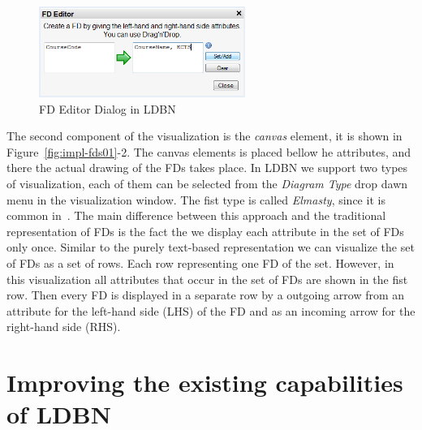 \begin{figure}[h]
	\begin{center}
		\includegraphics[width=0.6\textwidth]{./img/fdeditor.png}
		\caption{FD Editor Dialog in LDBN}
		\label{fig:fdeditor}
	\end{center}
\end{figure}

The second component of the visualization is the \emph{canvas} element, it is shown in Figure~\ref{fig:impl-fds01}-2.
The canvas elements is placed bellow he attributes, and there the actual drawing 
of the FDs takes place. In LDBN we support two types of visualization, each of them can be selected
from the \emph{Diagram Type} drop dawn menu in the visualization window. The fist type is called 
\emph{Elmasty}, since it is common in~\cite{bdb1}. The main difference between this approach and
the traditional representation of FDs is the fact the we display each attribute in the set of 
FDs only once. 
Similar to the purely text-based representation we can visualize the set
of FDs as a set of rows. Each row representing one FD of the set. 
However, in this visualization all attributes that occur in the set of FDs
are shown in the fist row. Then every FD is displayed in a separate row by a outgoing 
arrow from an attribute for the left-hand side (LHS) of the FD 
and as an incoming arrow for the right-hand side (RHS).

\section{Improving the existing capabilities of LDBN}
\label{sec:improving}



